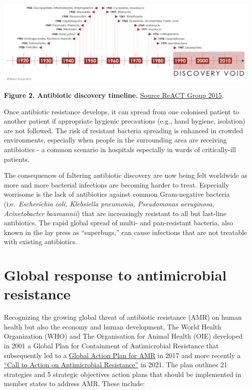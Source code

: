\documentclass[
]{book}
\begin{document}
\includegraphics[width=8.33333in,height=\textheight]{images/ab-discovery-timeline.png}

\textbf{Figure 2. Antibiotic discovery timeline.} \href{https://www.reactgroup.org/}{Source ReACT Group 2015}.

Once antibiotic resistance develops, it can spread from one colonised patient to another patient if appropriate hygienic precautions (e.g., hand hygiene, isolation) are not followed. The risk of resistant bacteria spreading is enhanced in crowded environments, especially when people in the surrounding area are receiving antibiotics - a common scenario in hospitals especially in wards of critically-ill patients.

The consequences of faltering antibiotic discovery are now being felt worldwide as more and more bacterial infections are becoming harder to treat. Especially worrisome is the lack of antibiotics against common Gram-negative bacteria (i.e.~\emph{Escherichia coli, Klebsiella pneumonia, Pseudomonas aeruginosa, Acinetobacter baumannii}) that are increasingly resistant to all but last-line antibiotics. The rapid global spread of multi- and pan-resistant bacteria, also known in the lay press as ``superbugs,'' can cause infections that are not treatable with existing antibiotics.

\hypertarget{global-response-to-antimicrobial-resistance}{%
\section*{Global response to antimicrobial resistance}\label{global-response-to-antimicrobial-resistance}}

Recognizing the growing global threat of antibiotic resistance (AMR) on human health but also the economy and human development, The World Health Organization (WHO) and The Organisation for Animal Health (OIE) developed in 2001 a Global Plan for Containment of Antimicrobial Resistance that subsequently led to a \href{https://www.who.int/publications/i/item/9789241509763}{Global Action Plan for AMR} in 2017 and more recently a \href{https://www.who.int/news/item/30-07-2021-call-to-action-on-antimicrobial-resistance-2021}{``Call to Action on Antimicrobial Resistance''} in 2021. The plan outlines 21 strategies and 5 strategic objectives action plans that should be implemented in member states to address AMR. These include:
\end{document}
